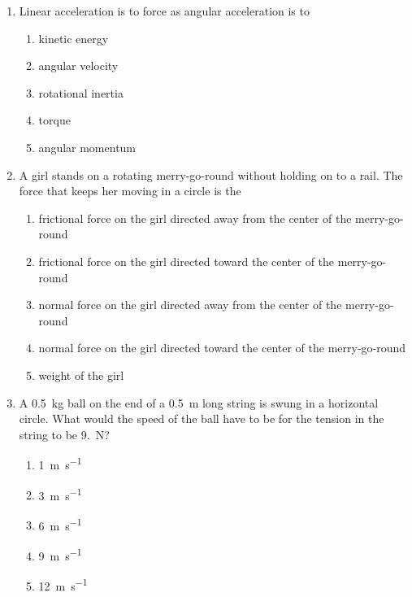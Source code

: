 \documentclass{../../oss-apphys}
\begin{document}
\genheader


\genmultidirections

\gengravity

\raggedcolumns
\begin{multicols}{2}
  \begin{enumerate}[leftmargin=18pt]

  \item Linear acceleration is to force as angular acceleration is to
    \begin{enumerate}[noitemsep,topsep=0pt,leftmargin=18pt,label=(\Alph*)]
    \item kinetic energy
    \item angular velocity
    \item rotational inertia
    \item torque
    \item angular momentum
    \end{enumerate}

  \item A girl stands on a rotating merry-go-round without holding on to a rail.
    The force that keeps her moving in a circle is the
    \begin{enumerate}[noitemsep,topsep=0pt,leftmargin=18pt,label=(\Alph*)]
    \item frictional force on the girl directed away from the center of the
      merry-go-round
    \item frictional force on the girl directed toward the center of the
      merry-go-round
    \item normal force on the girl directed away from the center of the
      merry-go-round
    \item normal force on the girl directed toward the center of the
      merry-go-round
    \item weight of the girl
    \end{enumerate}

  \item A \SI{.5}{\kilo\gram} ball on the end of a \SI{.5}{\metre} long string
    is swung in a horizontal circle. What would the speed of the ball have to
    be for the tension in the string to be \SI{9.}{\newton}?
    \begin{center}
      \vspace{-.1in}
    \end{center}
    \begin{enumerate}[noitemsep,topsep=0pt,leftmargin=18pt,label=(\Alph*)]
    \item\SI{1}{\metre\per\second}
    \item\SI{3}{\metre\per\second}
    \item\SI{6}{\metre\per\second}
    \item\SI{9}{\metre\per\second}
    \item\SI{12}{\metre\per\second}
    \end{enumerate}
    \columnbreak
    

\end{enumerate}
\end{multicols}
\end{document}
